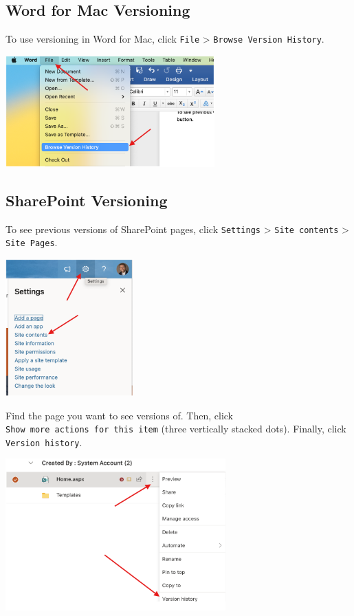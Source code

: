 \documentclass[
  letterpaper,
  DIV=11,
  numbers=noendperiod]{scrreprt}
\begin{document}
\subsection*{Word for Mac Versioning}\label{word-for-mac-versioning}

To use versioning in Word for Mac, click \texttt{File} \textgreater{}
\texttt{Browse\ Version\ History}.

\begin{center}
\includegraphics[width=3.17in,height=\textheight]{chapters/authoring_sops/../../graphics/word_mac_versioning.png}
\end{center}

\subsection*{SharePoint Versioning}\label{sharepoint-versioning}

To see previous versions of SharePoint pages, click \texttt{Settings}
\textgreater{} \texttt{Site\ contents} \textgreater{}
\texttt{Site\ Pages}.

\begin{center}
\includegraphics[width=1.94in,height=\textheight]{chapters/authoring_sops/../../graphics/sharepoint_versioning.png}
\end{center}

Find the page you want to see versions of. Then, click
\texttt{Show\ more\ actions\ for\ this\ item} (three vertically stacked
dots). Finally, click \texttt{Version\ history}.

\begin{center}
\includegraphics[width=3.33in,height=\textheight]{chapters/authoring_sops/../../graphics/sharepoint_versioning_2.png}
\end{center}
\end{document}
